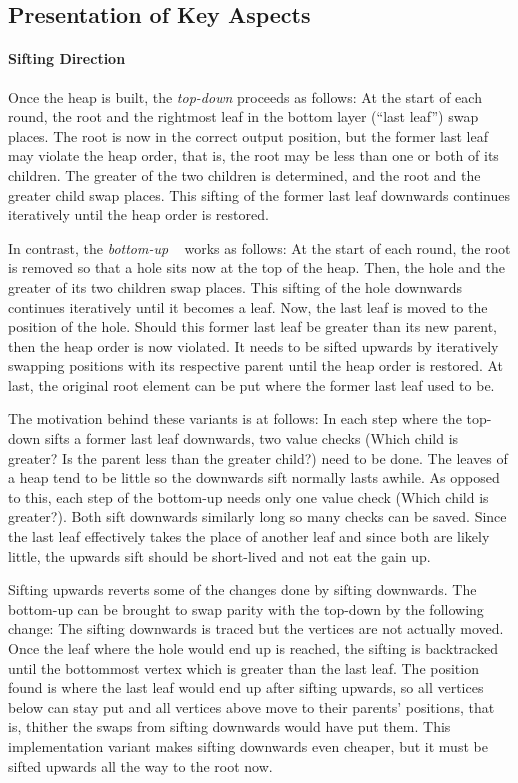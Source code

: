\subsection{Presentation of Key Aspects}
\label{sec:tasklet:heap:aspects}

\paragraph{Sifting Direction}
Once the heap is built, the \emph{top-down} \HS{} proceeds as follows:
At the start of each round, the root and the rightmost leaf in the bottom layer (\enquote{last leaf}) swap places.
The root is now in the correct output position, but the former last leaf may violate the heap order, that is, the root may be less than one or both of its children.
The greater of the two children is determined, and the root and the greater child swap places.
This sifting of the former last leaf downwards continues iteratively until the heap order is restored.

In contrast, the \emph{bottom-up} \HS{}~\cite{wegener1993heapsort} works as follows:
At the start of each round, the root is removed so that a hole sits now at the top of the heap.
Then, the hole and the greater of its two children swap places.
This sifting of the hole downwards continues iteratively until it becomes a leaf.
Now, the last leaf is moved to the position of the hole.
Should this former last leaf be greater than its new parent, then the heap order is now violated.
It needs to be sifted upwards by iteratively swapping positions with its respective parent until the heap order is restored.
At last, the original root element can be put where the former last leaf used to be.

The motivation behind these variants is at follows:
In each step where the top-down \HS{} sifts a former last leaf downwards, two value checks (Which child is greater? Is the parent less than the greater child?) need to be done.
The leaves of a heap tend to be little so the downwards sift normally lasts awhile.
As opposed to this, each step of the bottom-up \HS{} needs only one value check (Which child is greater?).
Both \HS*{} sift downwards similarly long so many checks can be saved.
Since the last leaf effectively takes the place of another leaf and since both are likely little, the upwards sift should be short-lived and not eat the gain up.

Sifting upwards reverts some of the changes done by sifting downwards.
The bottom-up \HS{} can be brought to swap parity with the top-down \HS{} by the following change:
The sifting downwards is traced but the vertices are not actually moved.
Once the leaf where the hole would end up is reached, the sifting is backtracked until the bottommost vertex which is greater than the last leaf.
The position found is where the last leaf would end up after sifting upwards, so all vertices below can stay put and all vertices above move to their parents' positions, that is, thither the swaps from sifting downwards would have put them.
This implementation variant makes sifting downwards even cheaper, but it must be sifted upwards all the way to the root now.


